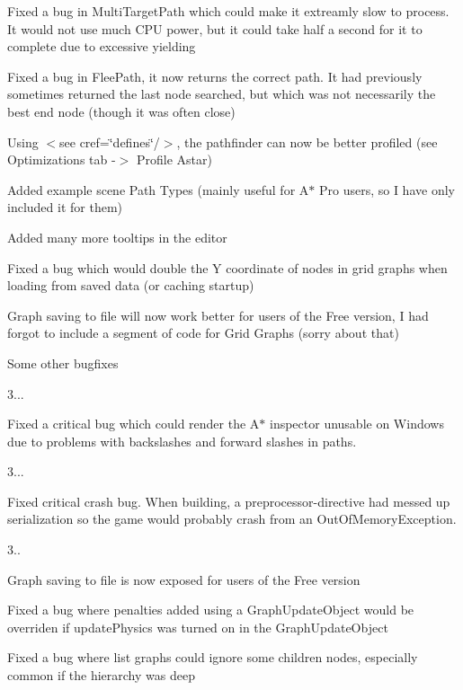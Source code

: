 \begin{DoxyItemize}
\begin{DoxyItemize}
\item Fixed a bug in Multi\+Target\+Path which could make it extreamly slow to process. It would not use much C\+PU power, but it could take half a second for it to complete due to excessive yielding
\item Fixed a bug in Flee\+Path, it now returns the correct path. It had previously sometimes returned the last node searched, but which was not necessarily the best end node (though it was often close)
\item Using $<$see cref=\char`\"{}defines\char`\"{}/$>$, the pathfinder can now be better profiled (see Optimizations tab -\/$>$ Profile Astar)
\item Added example scene Path Types (mainly useful for A$\ast$ Pro users, so I have only included it for them)
\item Added many more tooltips in the editor
\item Fixed a bug which would double the Y coordinate of nodes in grid graphs when loading from saved data (or caching startup)
\item Graph saving to file will now work better for users of the Free version, I had forgot to include a segment of code for Grid Graphs (sorry about that)
\item Some other bugfixes
\end{DoxyItemize}
\item 3...
\begin{DoxyItemize}
\item Fixed a critical bug which could render the A$\ast$ inspector unusable on Windows due to problems with backslashes and forward slashes in paths.
\end{DoxyItemize}
\item 3...
\begin{DoxyItemize}
\item Fixed critical crash bug. When building, a preprocessor-\/directive had messed up serialization so the game would probably crash from an Out\+Of\+Memory\+Exception.
\end{DoxyItemize}
\item 3..
\begin{DoxyItemize}
\item Graph saving to file is now exposed for users of the Free version
\item Fixed a bug where penalties added using a Graph\+Update\+Object would be overriden if update\+Physics was turned on in the Graph\+Update\+Object
\item Fixed a bug where list graphs could ignore some children nodes, especially common if the hierarchy was deep

\end{DoxyItemize}
\end{DoxyItemize}
